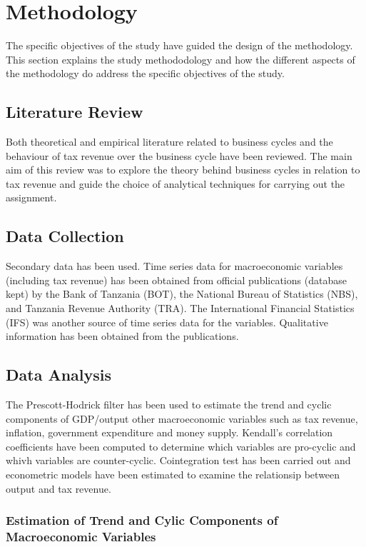 \documentclass[12pt,a4paper,final]{article}
\begin{document}
\section{Methodology}
The specific objectives of the study have guided the design of the  methodology. This section explains the study methododology  and how the different aspects of the methodology do address the specific objectives of the study.

\subsection{Literature Review}

Both theoretical and empirical literature related to business cycles and the behaviour of tax revenue over the business cycle have been reviewed.  The main aim of this review was to explore the theory behind business cycles in relation to tax revenue and guide the choice of analytical techniques for carrying out the assignment.

\subsection{Data Collection}

Secondary data has been used. Time series data for macroeconomic variables (including tax revenue) has been obtained from official publications (database kept) by the Bank of Tanzania (BOT), the National Bureau of Statistics (NBS), and Tanzania Revenue Authority (TRA).  The International Financial Statistics (IFS) was another source of time series data for the variables.  Qualitative information has been obtained from the publications.

\subsection{Data Analysis}

The Prescott-Hodrick filter has been used to estimate the trend and cyclic components of GDP/output other macroeconomic variables such as tax revenue, inflation, government expenditure and money supply. Kendall's correlation coefficients have been computed to determine which variables are pro-cyclic and whivh variables are counter-cyclic. Cointegration test has been carried out and econometric models have been estimated to examine the relationsip between output and tax revenue.

\subsubsection{Estimation of Trend and Cylic Components of Macroeconomic Variables}
\end{document}
